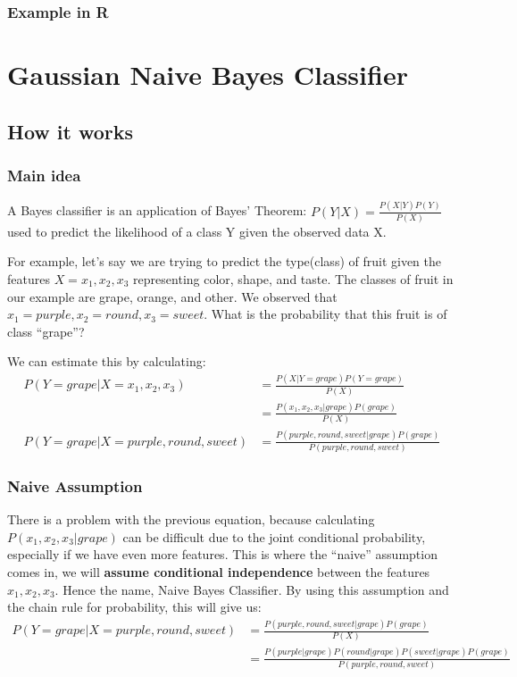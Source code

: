 \documentclass{article}
\begin{document}
\newpage

\subsubsection{Example in R}


\newpage
\section{Gaussian Naive Bayes Classifier}

\subsection{How it works}
\subsubsection{Main idea}
A Bayes classifier is an application of Bayes' Theorem: $P(Y|X) = \frac{P(X|Y)P(Y)}{P(X)}$ used to predict the likelihood of a class Y given the observed data X.\newline

For example, let's say we are trying to predict the type(class) of fruit given the features $X = x_{1},x_{2},x_{3}$ representing color, shape, and taste. The classes of fruit in our example are grape, orange, and other. We observed that $x_{1} = purple, x_{2} = round, x_{3} = sweet$. What is the probability that this fruit is of class ``grape''?\newline

We can estimate this by calculating: 
\begin{align*}
P(Y=grape|X=x_{1},x_{2},x_{3})&=\frac{P(X|Y=grape)P(Y=grape)}{P(X)}\\
&= \frac{P(x_{1},x_{2},x_{3}|grape)P(grape)}{P(X)}\\
P(Y=grape|X=purple,round,sweet) &= \frac{P(purple,round,sweet|grape)P(grape)}{P(purple,round,sweet)}
\end{align*}

\subsubsection{Naive Assumption}
There is a problem with the previous equation, because calculating $P(x_{1},x_{2},x_{3}|grape)$ can be difficult due to the joint conditional probability, especially if we have even more features. This is where the ``naive'' assumption comes in, we will \textbf{assume conditional independence} between the features $x_{1},x_{2},x_{3}$. Hence the name, Naive Bayes Classifier. By using this assumption and the chain rule for probability, this will give us:
\begin{align*}
P(Y=grape|X=purple,round,sweet)&= \frac{P(purple,round,sweet|grape)P(grape)}{P(X)}\\
&= \frac{P(purple|grape)P(round|grape)P(sweet|grape)P(grape)}{P(purple,round,sweet)}
\end{align*}
\end{document}
